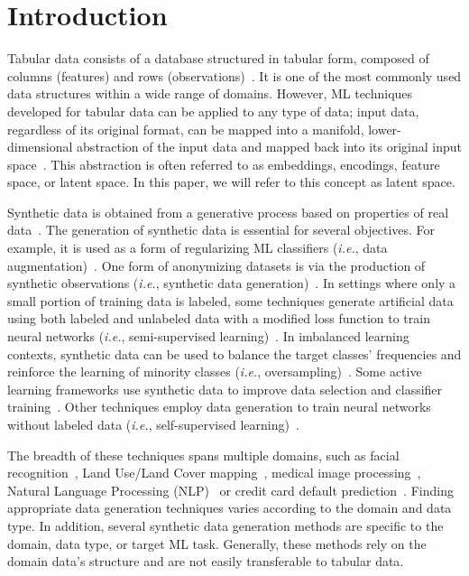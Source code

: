 \section{Introduction}\label{sec:introduction}


Tabular data consists of a database structured in tabular form, composed of
columns (features) and rows (observations)~\cite{yoon2020vime}. It is one of
the most commonly used data structures within a wide range of domains.
However, ML techniques developed for tabular data can be applied to any type
of data; input data, regardless of its original format, can be mapped into a
manifold, lower-dimensional abstraction of the input data and mapped back into
its original input space~\cite{kingma2019introduction, DeVries2017}.
This abstraction is often referred to as embeddings, encodings, feature
space, or latent space. In this paper, we will refer to this concept as
latent space.

Synthetic data is obtained from a generative process based on properties of
real data~\cite{assefa2020generating}. The generation of synthetic data is
essential for several objectives. For example, it is used as a form of
regularizing ML classifiers (\textit{i.e.}, data
augmentation)~\cite{wang2021regularizing}. One form of anonymizing datasets is
via the production of synthetic observations (\textit{i.e.}, synthetic data
generation)~\cite{patki2016synthetic}. In settings where only a small portion
of training data is labeled, some techniques generate artificial data using
both labeled and unlabeled data with a modified loss function to train neural
networks (\textit{i.e.}, semi-supervised learning)~\cite{laine2017temporal}.
In imbalanced learning contexts, synthetic data can be used to balance the
target classes' frequencies and reinforce the learning of minority classes
(\textit{i.e.}, oversampling)~\cite{Fonseca2021}. Some active
learning frameworks use synthetic data to improve data selection and
classifier training~\cite{Kim2021}. Other techniques employ data
generation to train neural networks without labeled data (\textit{i.e.},
self-supervised learning)~\cite{grill2020bootstrap}.

The breadth of these techniques spans multiple domains, such as facial
recognition~\cite{lv2017data}, Land Use/Land Cover
mapping~\cite{Douzas2019rs}, medical image
processing~\cite{yi2019generative}, Natural Language Processing
(NLP)~\cite{feng2021survey} or credit card default
prediction~\cite{alam2020investigation}. Finding appropriate data
generation techniques varies according to the domain and data type. In
addition, several synthetic data generation methods are specific to the
domain, data type, or target ML task. Generally, these methods rely on
the domain data's structure and are not easily transferable to tabular
data.

